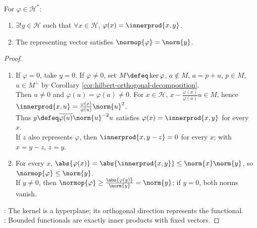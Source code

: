 \begin{theorem} \label{thm:riesz-representation-hilbert-space} \\
For $\varphi\in\mathcal{H}^*$:
\begin{enumerate}[label=(\roman*)]
\setlength{\itemsep}{0pt}
\item $\exists!y\in\mathcal{H}$ such that $\forall x\in\mathcal{H}$, $\varphi(x)=\innerprod{x,y}$.
\item The representing vector satisfies $\normop{\varphi}=\norm{y}$.
\end{enumerate}
\begin{proof}
\begin{enumerate}[label=(\roman*)]
\setlength{\itemsep}{0pt}
\item If $\varphi=0$, take $y=0$. If $\varphi\neq0$, set $M\defeq\ker\varphi$, $a\notin M$, $a=p+u$, $p\in M$, $u\in M^\perp$ by Corollary \ref{cor:hilbert-orthogonal-decomposition}.\\
Then $u\neq0$ and $\varphi(u)=\varphi(a)\neq0$. For $x\in\mathcal{H}$, $x-\frac{\varphi(x)}{\varphi(u)}u\in M$, hence $\innerprod{x,u}=\frac{\varphi(x)}{\varphi(u)}\norm{u}^2$.\\
Thus $y\defeq\overline{\varphi(u)}\norm{u}^{-2}u$ satisfies $\varphi(x)=\innerprod{x,y}$ for every $x$.\\
If $z$ also represents $\varphi$, then $\innerprod{x,y-z}=0$ for every $x$; with $x=y-z$, $z=y$.
\item For every $x$, $\abs{\varphi(x)}=\abs{\innerprod{x,y}}\leq\norm{x}\norm{y}$, so $\normop{\varphi}\leq\norm{y}$.\\
If $y\neq0$, then $\normop{\varphi}\geq\frac{\abs{\varphi(y)}}{\norm{y}}=\norm{y}$; if $y=0$, both norms vanish.
\end{enumerate}
: The kernel is a hyperplane; its orthogonal direction represents the functional.\\
: Bounded functionals are exactly inner products with fixed vectors.
\end{proof}
\end{theorem}

